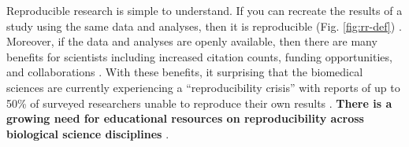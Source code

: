 \documentclass[12pt,letterpaper]{article}
\begin{document}

Reproducible research is simple to understand. 
If you can recreate the results of a study using the same data and analyses, then it is reproducible (Fig. \ref{fig:rr-def}) \citep{buckheit1995wavelab,peng2011reproducible,patil2016statistical}. 
Moreover, if the data and analyses are openly available, then there  are many benefits for scientists including increased citation counts, funding opportunities, and collaborations \citep{mckiernan2016open,stewart-lowndes2017path,schmidt2016stepping}.
With these benefits, it surprising that the biomedical sciences are currently experiencing a ``reproducibility crisis'' with reports of up to 50\% of surveyed researchers unable to reproduce their own results \citep{baker2016scientists}.
\textbf{There is a growing need for educational resources on reproducibility across biological science disciplines} \citep{barone2017unmet}.
\end{document}
